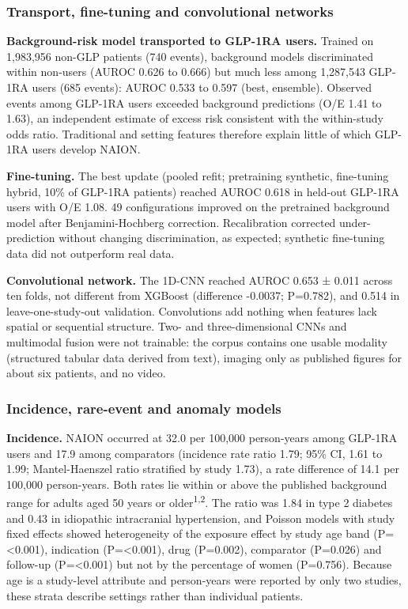 \documentclass[
  11pt,
]{article}
\begin{document}
\subsubsection{Transport, fine-tuning and convolutional
networks}\label{transport-fine-tuning-and-convolutional-networks}

\textbf{Background-risk model transported to GLP-1RA users.} Trained on
1,983,956 non-GLP patients (740 events), background models discriminated
within non-users (AUROC 0.626 to 0.666) but much less among 1,287,543
GLP-1RA users (685 events): AUROC 0.533 to 0.597 (best, ensemble).
Observed events among GLP-1RA users exceeded background predictions (O/E
1.41 to 1.63), an independent estimate of excess risk consistent with
the within-study odds ratio. Traditional and setting features therefore
explain little of which GLP-1RA users develop NAION.

\textbf{Fine-tuning.} The best update (pooled refit; pretraining
synthetic, fine-tuning hybrid, 10\% of GLP-1RA patients) reached AUROC
0.618 in held-out GLP-1RA users with O/E 1.08. 49 configurations
improved on the pretrained background model after Benjamini-Hochberg
correction. Recalibration corrected under-prediction without changing
discrimination, as expected; synthetic fine-tuning data did not
outperform real data.

\textbf{Convolutional network.} The 1D-CNN reached AUROC 0.653 ± 0.011
across ten folds, not different from XGBoost (difference -0.0037;
P=0.782), and 0.514 in leave-one-study-out validation. Convolutions add
nothing when features lack spatial or sequential structure. Two- and
three-dimensional CNNs and multimodal fusion were not trainable: the
corpus contains one usable modality (structured tabular data derived
from text), imaging only as published figures for about six patients,
and no video.

\subsubsection{Incidence, rare-event and anomaly
models}\label{incidence-rare-event-and-anomaly-models}

\textbf{Incidence.} NAION occurred at 32.0 per 100,000 person-years
among GLP-1RA users and 17.9 among comparators (incidence rate ratio
1.79; 95\% CI, 1.61 to 1.99; Mantel-Haenszel ratio stratified by study
1.73), a rate difference of 14.1 per 100,000 person-years. Both rates
lie within or above the published background range for adults aged 50
years or older\textsuperscript{1,2}. The ratio was 1.84 in type 2
diabetes and 0.43 in idiopathic intracranial hypertension, and Poisson
models with study fixed effects showed heterogeneity of the exposure
effect by study age band (P=\textless0.001), indication
(P=\textless0.001), drug (P=0.002), comparator (P=0.026) and follow-up
(P=\textless0.001) but not by the percentage of women (P=0.756). Because
age is a study-level attribute and person-years were reported by only
two studies, these strata describe settings rather than individual
patients.
\end{document}
